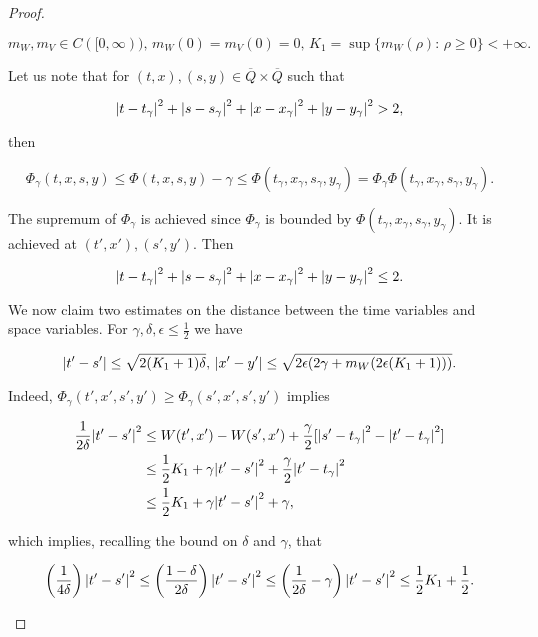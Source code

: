 \begin{proof}
\begin{enumerate}[label=\arabic*')]
        \[m_W,m_V\in C([0,\infty)),\, m_W(0)=m_V(0)=0,\, K_1=\sup\{m_W(\rho):\,\rho\geq0\}<+\infty.\]

        Let us note that for $(t,x),(s,y)\in\overline{Q}\times\overline{Q}$ such that 

        \[\abs{t-t_{\gamma}}^2+\abs{s-s_{\gamma}}^2 + \abs{x-x_{\gamma}}^2 + \abs{y-y_{\gamma}}^2>2,\]

        then

        \[\Phi_{\gamma}(t,x,s,y) \leq \Phi(t,x,s,y) - \gamma \leq \Phi(t_{\gamma},x_{\gamma},s_{\gamma},y_{\gamma}) = \Phi_{\gamma}\Phi(t_{\gamma},x_{\gamma},s_{\gamma},y_{\gamma}).\]

        The supremum of $\Phi_{\gamma}$ is achieved since $\Phi_{\gamma}$ is bounded by $\Phi(t_{\gamma},x_{\gamma},s_{\gamma},y_{\gamma})$. It is achieved at $(t',x'),(s',y')$. Then

        \begin{equation}
            \abs{t-t_{\gamma}}^2+\abs{s-s_{\gamma}}^2 + \abs{x-x_{\gamma}}^2 + \abs{y-y_{\gamma}}^2\leq2.
        \end{equation}

        We now claim two estimates on the distance between the time variables and space variables. For $\gamma,\delta,\epsilon\leq\frac{1}{2}$ we have

        \begin{equation}\label{4-2-inproofSup:unboundedCLAIMS}
            \abs{t'-s'} \leq \sqrt{2(K_1+1)\delta},\,\abs{x'-y'}\leq\sqrt{2\epsilon(2\gamma + m_W(2\epsilon(K_1+1)))}.
        \end{equation}

        Indeed, $\Phi_{\gamma}(t',x',s',y')\geq\Phi_{\gamma}(s',x',s',y')$ implies

        \begin{align*}
            \frac{1}{2\delta}\abs{t'-s'}^2 & \leq W(t',x')-W(s',x') + \frac{\gamma}{2}[\abs{s'-t_{\gamma}}^2-\abs{t'-t_{\gamma}}^2] \\
            & \leq \frac{1}{2}K_1 + \gamma\abs{t'-s'}^2 + \frac{\gamma}{2}\abs{t'-t_{\gamma}}^2 \\
            & \leq \frac{1}{2}K_1 + \gamma\abs{t'-s'}^2 + \gamma,
        \end{align*}

        which implies, recalling the bound on $\delta$ and $\gamma$, that 

        \[\left(\frac{1}{4\delta}\right)\abs{t'-s'}^2\leq\left(\frac{1-\delta}{2\delta}\right)\abs{t'-s'}^2\leq\left(\frac{1}{2\delta}-\gamma\right)\abs{t'-s'}^2\leq \frac{1}{2}K_1 + \frac{1}{2}.\]


\end{enumerate}
\end{proof}
